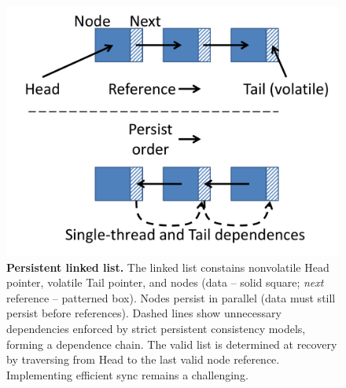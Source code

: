 \begin{figure}
\centering
\includegraphics[width=.7\textwidth]{PMC_patterns/linkedlist.pdf}
\caption{\textbf{Persistent linked list.}  The linked list constains nonvolatile Head pointer, volatile Tail pointer, and nodes (data -- solid square; \emph{next} reference -- patterned box).  Nodes persist in parallel (data must still persist before references).  Dashed lines show unnecessary dependencies enforced by strict persistent consistency models, forming a dependence chain.  The valid list is determined at recovery by traversing from Head to the last valid node reference.  Implementing efficient sync remains a challenging.}
\label{fig:LinkedList}
\end{figure}
